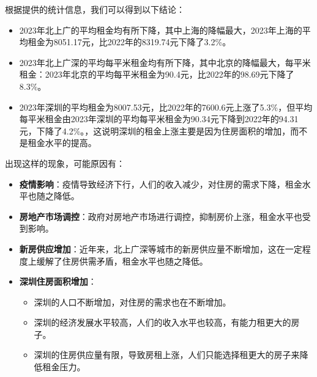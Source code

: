 \documentclass[lang=cn,11pt,a4paper]{elegantpaper}
\begin{document}
根据提供的统计信息，我们可以得到以下结论：

\begin{itemize}
    \item 2023年北上广的平均租金均有所下降，其中上海的降幅最大，2023年上海的平均租金为8051.17元，比2022年的8319.74元下降了3.2\%。
    \item 2023年北上广深的平均每平米租金均有所下降，其中北京的降幅最大，每平米租金：2023年北京的平均每平米租金为90.4元，比2022年的98.69元下降了8.3\%。
    \item 2023年深圳的平均租金为8007.53元，比2022年的7600.6元上涨了5.3\%，但平均每平米租金由2023年深圳的平均每平米租金为90.34元下降到2022年的94.31元，下降了4.2\%。，这说明深圳的租金上涨主要是因为住房面积的增加，而不是租金水平的提高。
\end{itemize}

出现这样的现象，可能原因有：

\begin{itemize}
    \item \textbf{疫情影响}：疫情导致经济下行，人们的收入减少，对住房的需求下降，租金水平也随之降低。
    \item \textbf{房地产市场调控}：政府对房地产市场进行调控，抑制房价上涨，租金水平也受到影响。
    \item \textbf{新房供应增加}：近年来，北上广深等城市的新房供应量不断增加，这在一定程度上缓解了住房供需矛盾，租金水平也随之降低。
    \item \textbf{深圳住房面积增加}：
    \begin{itemize}
        \item 深圳的人口不断增加，对住房的需求也在不断增加。
        \item 深圳的经济发展水平较高，人们的收入水平也较高，有能力租更大的房子。
        \item 深圳的住房供应量有限，导致房租上涨，人们只能选择租更大的房子来降低租金压力。
    \end{itemize}
\end{itemize}
\end{document}
